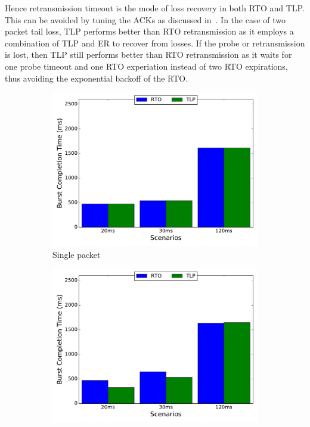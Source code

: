 \documentclass[10pt,conference]{IEEEtran}
\begin{document}
Hence retransmission timeout is the mode of loss recovery in both RTO and TLP. This can be avoided by tuning
the ACKs as discussed in~\cite{Rajiullah:2015}. In the case of two packet tail loss, TLP performs better than RTO retransmission as it employs a combination of TLP and ER to recover from losses. If the probe or retransmission is lost, then TLP still performs better than RTO retransmission as it waits for one probe timeout and one RTO experiation instead of two RTO expirations, thus avoiding the exponential backoff of the RTO.

\begin{figure}[!tbp]
 \begin{subfigure}[b]{0.32\textwidth}
	\includegraphics[angle=0, width=\textwidth,natwidth=578.16,natheight=433.62]{plots/T1P.pdf}
	\caption{Single packet}\label{t1p}
 \end{subfigure}
 \hfill
 \begin{subfigure}[b]{0.32\textwidth}
	\includegraphics[angle=0, width=\textwidth,natwidth=578.16,natheight=433.62]{plots/T2P.pdf}

\end{subfigure}
\end{figure}
\end{document}
